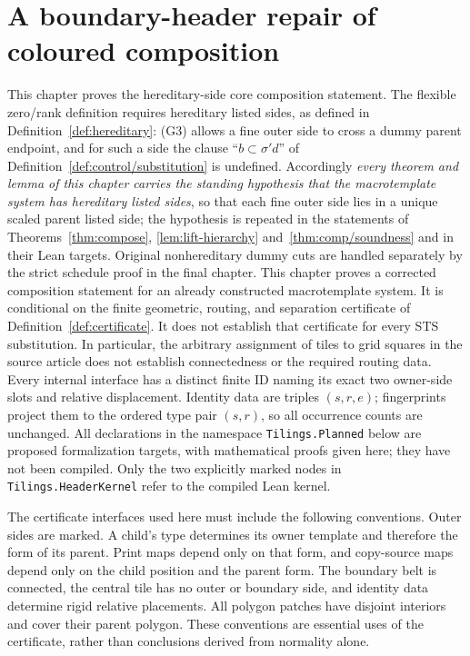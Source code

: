 
\section{A boundary-header repair of coloured composition}

This chapter proves the hereditary-side core composition statement. The
flexible zero/rank definition requires hereditary listed sides, as defined
in Definition~\ref{def:hereditary}: (G3) allows a fine outer side to cross
a dummy parent endpoint, and for such a side the clause ``$b\subset\sigma'd$''
of Definition~\ref{def:control/substitution} is undefined. Accordingly
\emph{every theorem and lemma of this chapter carries the standing
hypothesis that the macrotemplate system has hereditary listed sides}, so
that each fine outer side lies in a unique scaled parent listed side; the
hypothesis is repeated in the statements of Theorems~\ref{thm:compose},
\ref{lem:lift-hierarchy} and~\ref{thm:comp/soundness} and in their Lean
targets. Original nonhereditary dummy cuts are
handled separately by the strict schedule proof in the final chapter.
This chapter proves a corrected composition statement for an already
constructed macrotemplate system. It is conditional on the finite geometric,
routing, and separation certificate of Definition~\ref{def:certificate}.
It does not establish that certificate for every STS substitution. In
particular, the arbitrary assignment of tiles to grid squares in the source
article does not establish connectedness or the required routing data.
Every internal interface has a distinct finite ID naming its exact two
owner-side slots and relative displacement. Identity data are triples
$(s,r,e)$; fingerprints project them to the ordered type pair $(s,r)$,
so all occurrence counts are unchanged.
All declarations in the namespace \texttt{Tilings.Planned} below are proposed
formalization targets, with mathematical proofs given here; they have not
been compiled. Only the two explicitly marked nodes in
\texttt{Tilings.HeaderKernel} refer to the compiled Lean kernel.

The certificate interfaces used here must include the following conventions.
Outer sides are marked. A child's type determines its owner template and
therefore the form of its parent. Print maps depend only on that form, and
copy-source maps depend only on the child position and the parent form.
The boundary belt is connected, the central tile has no outer or boundary
side, and identity data determine rigid relative placements. All polygon
patches have disjoint interiors and cover their parent polygon. These
conventions are essential uses of the certificate, rather than conclusions
derived from normality alone.

